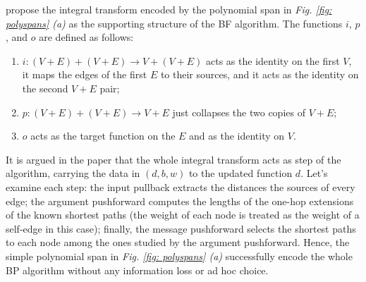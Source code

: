 \documentclass[11pt,a4paper,openright,twoside]{report}
\theoremstyle{plain}
\theoremstyle{definition}
\begin{document}
\cite{dudzik2022graph} propose the integral transform encoded by the polynomial span in \textit{Fig. \ref{fig: polyspans} (a)} as the supporting structure of the BF algorithm. The functions $i$, $p$, and $o$ are defined as follows:
\begin{enumerate}
  \item $i: (V + E) + (V + E) \to V + (V + E)$ acts as the identity on the first $V$, it maps the edges of the first $E$ to their sources, and it acts as the identity on the second $V + E$ pair;
  \item $p: (V + E) + (V + E) \to V + E$ just collapses the two copies of $V + E$;
  \item $o$ acts as the target function on the $E$ and as the identity on $V$.
\end{enumerate}
It is argued in the paper that the whole integral transform acts as step of the algorithm, carrying the data in $(d, b, w)$ to the updated function $d$. Let's examine each step: the input pullback extracts the distances the sources of every edge; the argument pushforward computes the lengths of the one-hop extensions of the known shortest paths (the weight of each node is treated as the weight of a self-edge in this case); finally, the message pushforward selects the shortest paths to each node among the ones studied by the argument pushforward. 
Hence, the simple polynomial span in \textit{Fig. \ref{fig: polyspans} (a)} successfully encode the whole BP algorithm without any information loss or ad hoc choice. 
\end{document}
